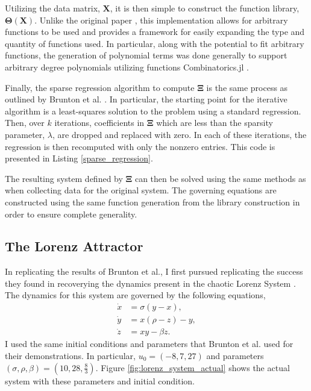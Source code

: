 \documentclass[10pt]{paper}
\begin{document}
Utilizing the data matrix, $\mathbf X$, it is then simple to construct the function library, $\mathbf \Theta(\mathbf X)$.
Unlike the original paper \cite{sindy}, this implementation allows for arbitrary functions to be used and provides a framework for easily expanding the type and quantity of functions used. 
In particular, along with the potential to fit arbitrary functions, the generation of polynomial terms was done generally to support arbitrary degree polynomials utilizing functions Combinatorics.jl \cite{Combinatorics.jl}.

Finally, the sparse regression algorithm to compute $\mathbf \Xi$ is the same process as outlined by Brunton et al. \cite{sindy}. In particular, the starting point for the iterative algorithm is a least-squares solution to the problem using a standard regression. Then, over $k$ iterations, coefficients in $\mathbf \Xi$ which are less than the sparsity parameter, $\lambda$, are dropped and replaced with zero. In each of these iterations, the regression is then recomputed with only the nonzero entries. 
This code is presented in Listing \ref{sparse_regression}.


The resulting system defined by $\mathbf \Xi$ can then be solved using the same methods as when collecting data for the original system. The governing equations are constructed using the same function generation from the library construction in order to ensure complete generality. 


\subsection{The Lorenz Attractor} \label{sec:lorenz_results}
In replicating the results of Brunton et al., I first pursued replicating the success they found in recoverying the dynamics present in the chaotic Lorenz System \cite{sindy}\cite{lorenz1963deterministic}. 
The dynamics for this system are governed by the following equations, 
\begin{equation}\label{eq:lorenz}
\begin{split}
	\dot x &= \sigma(y - x), \\
	\dot y &= x(\rho - z) - y, \\
	\dot z &= xy - \beta z.
\end{split}
\end{equation}
I used the same initial conditions and parameters that Brunton et al. \cite{sindy} used for their demonstrations. In particular, $u_0 = (-8, 7, 27)$ and parameters $(\sigma, \rho, \beta) = \left( 10, 28, \frac 83 \right)$. 
Figure \ref{fig:lorenz_system_actual} shows the actual system with these parameters and initial condition. 
\end{document}
